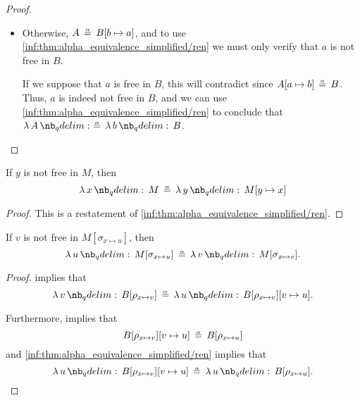 \begin{proof}
\begin{itemize}
    \item Otherwise, \( A \aequiv B[b \mapsto a] \), and to use \ref{inf:thm:alpha_equivalence_simplified/ren} we must only verify that \( a \) is not free in \( B \).

    If we suppose that \( a \) is free in \( B \), this will contradict  since \( A[a \mapsto b] \aequiv B \). Thus, \( a \) is indeed not free in \( B \), and we can use \ref{inf:thm:alpha_equivalence_simplified/ren} to conclude that \( \qabs A \aequiv \qabs b B \).
  \end{itemize}
\end{proof}

\begin{corollary}\label{thm:alpha_conversion}
  If \( y \) is not free in \( M \), then
  \begin{equation}\label{eq:thm:alpha_conversion}
    \qabs x M \aequiv \qabs y M[y \mapsto x]
  \end{equation}
\end{corollary}
\begin{proof}
  This is a restatement of \ref{inf:thm:alpha_equivalence_simplified/ren}.
\end{proof}

\begin{corollary}\label{thm:alpha_conversion_modified}
  If \( v \) is not free in \( M[\sigma_{x \mapsto u}] \), then
  \begin{equation}\label{eq:thm:alpha_conversion_modified}
    \qabs u M[\sigma_{x \mapsto u}] \aequiv \qabs v M[\sigma_{x \mapsto v}].
  \end{equation}
\end{corollary}
\begin{proof}
   implies that
  \begin{equation*}
    \qabs v B[\rho_{x \mapsto v}]
    \aequiv
    \qabs u B[\rho_{x \mapsto v}][v \mapsto u].
  \end{equation*}

  Furthermore,  implies that
  \begin{equation*}
    B[\rho_{x \mapsto v}][v \mapsto u] \aequiv B[\rho_{x \mapsto u}]
  \end{equation*}
  and \ref{inf:thm:alpha_equivalence_simplified/ren} implies that
  \begin{equation*}
    \qabs u B[\rho_{x \mapsto v}][v \mapsto u] \aequiv \qabs u B[\rho_{x \mapsto u}].
  \end{equation*}
\end{proof}

